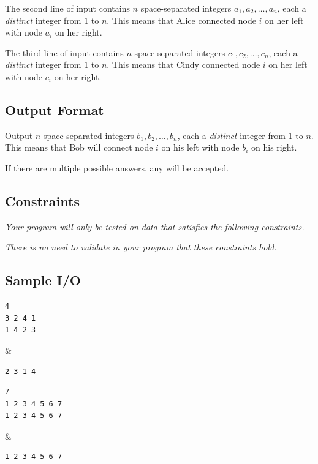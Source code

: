 The second line of input contains $n$ space-separated integers $a_1, a_2, \dots, a_n$, each a \textit{distinct} integer from $1$ to $n$.  This means that Alice connected node $i$ on her left with node $a_i$ on her right.

The third line of input contains $n$ space-separated integers $c_1, c_2, \dots, c_n$, each a \textit{distinct} integer from $1$ to $n$.  This means that Cindy connected node $i$ on her left with node $c_i$ on her right.

\subsection*{Output Format}

Output $n$ space-separated integers $b_1, b_2, \dots, b_n$, each a \textit{distinct} integer from $1$ to $n$.  This means that Bob will connect node $i$ on his left with node $b_i$ on his right.

If there are multiple possible answers, any will be accepted.

\subsection*{Constraints}

\textit{Your program will only be tested on data that satisfies the following constraints.}


\textit{There is no need to validate in your program that these constraints hold.}

\subsection*{Sample I/O}

\begin{sampleIO}
\begin{verbatim}
4
3 2 4 1
1 4 2 3
\end{verbatim}
&
\begin{verbatim}
2 3 1 4
\end{verbatim}
\end{sampleIO}

\begin{sampleIO}
\begin{verbatim}
7
1 2 3 4 5 6 7
1 2 3 4 5 6 7
\end{verbatim}
&
\begin{verbatim}
1 2 3 4 5 6 7
\end{verbatim}
\end{sampleIO}


